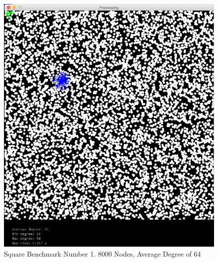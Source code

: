 \documentclass{article}
\begin{document}
\begin{center}
    \begin{figure}
        \includegraphics[scale=0.45]{./images/square_1.png}
        \caption{Square Benchmark Number 1. 8000 Nodes, Average Degree of 64}
        \label{square1}
    \end{figure}
\end{center}
\end{document}
